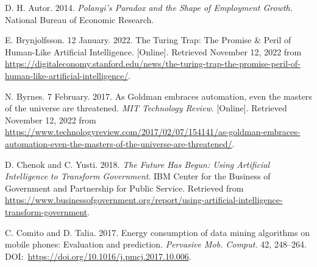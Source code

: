 \begin{thebibliography}{}
 D. H. Autor. 2014. \textit{Polanyi's Paradox and the Shape of Employment Growth}. National Bureau of Economic Research.

 E. Brynjolfsson. 12 January. 2022. The Turing Trap: The Promise \& Peril of Human-Like Artificial Intelligence. [Online]. Retrieved November 12, 2022 from \href{https://digitaleconomy.stanford.edu/news/the-turing-trap-the-promise-peril-of-human-like-artificial-intelligence/}{https://{\allowbreak}digitaleconomy.{\allowbreak}stanford.{\allowbreak}edu/{\allowbreak}news/{\allowbreak}the-{\allowbreak}turing-{\allowbreak}trap-{\allowbreak}the-{\allowbreak}promise-{\allowbreak}peril-{\allowbreak}of-{\allowbreak}human-{\allowbreak}like-{\allowbreak}artificial-{\allowbreak}intelligence/}.

 N. Byrnes. 7 February. 2017. As Goldman embraces automation, even the masters of the universe are threatened. \textit{MIT Technology Review}. [Online]. Retrieved November 12, 2022 from \href{https://www.technologyreview.com/2017/02/07/154141/as-goldman-embraces-automation-even-the-masters-of-the-universe-are-threatened/}{https://{\allowbreak}www.{\allowbreak}technologyreview.{\allowbreak}com/{\allowbreak}2017/{\allowbreak}02/{\allowbreak}07/{\allowbreak}154141/{\allowbreak}as-{\allowbreak}goldman-{\allowbreak}embraces-{\allowbreak}automation-{\allowbreak}even-{\allowbreak}the-{\allowbreak}masters-{\allowbreak}of-{\allowbreak}the-{\allowbreak}universe-{\allowbreak}are-{\allowbreak}threatened/}.

 D. Chenok and C. Yusti. 2018. \textit{The Future Has Begun: Using Artificial Intelligence to Transform Government}. IBM Center for the Business of Government and Partnership for Public Service. Retrieved from \href{https://www.businessofgovernment.org/report/using-artificial-intelligence-transform-government}{https://{\allowbreak}www.{\allowbreak}businessofgovernment.{\allowbreak}org/{\allowbreak}report/{\allowbreak}using-{\allowbreak}artificial-{\allowbreak}intelligence-{\allowbreak}transform-{\allowbreak}government}.

 C. Comito and D. Talia. 2017. Energy consumption of data mining algorithms on mobile phones: Evaluation and prediction. \textit{Pervasive Mob. Comput.} 42, 248--264. DOI:~\href{https://doi.org/10.1016/j.pmcj.2017.10.006}{https://{\allowbreak}doi.{\allowbreak}org/{\allowbreak}10.{\allowbreak}1016/{\allowbreak}j.{\allowbreak}pmcj.{\allowbreak}2017.{\allowbreak}10.006}.


\end{thebibliography}

